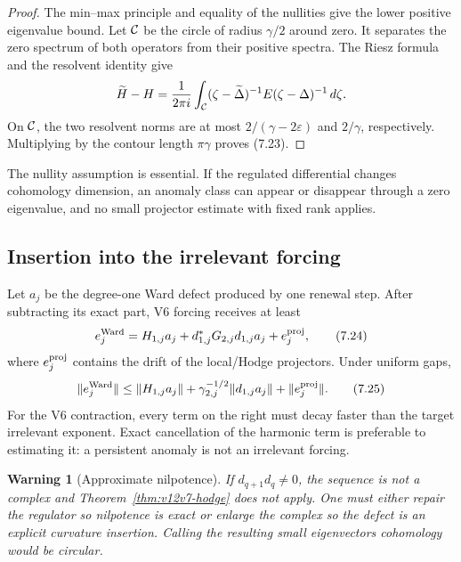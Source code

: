 \documentclass[11pt]{article}
\newtheorem{warning}[theorem]{Warning}
\theoremstyle{remark}
\begin{document}
\begin{proof}
The min--max principle and equality of the nullities give the lower
positive eigenvalue bound.  Let \({\cal C}\) be the circle of radius
\(\gamma/2\) around zero.  It separates the zero spectrum of both
operators from their positive spectra.  The Riesz formula and the
resolvent identity give
\[
 \widetilde H-H
 ={1\over2\pi i}\int_{\cal C}
   (\zeta-\widetilde\Delta)^{-1}
       E(\zeta-\Delta)^{-1}\,d\zeta.
\]
On \({\cal C}\), the two resolvent norms are at most
\(2/(\gamma-2\varepsilon)\) and \(2/\gamma\), respectively.
Multiplying by the contour length \(\pi\gamma\) proves (7.23).
\end{proof}

The nullity assumption is essential.  If the regulated differential
changes cohomology dimension, an anomaly class can appear or
disappear through a zero eigenvalue, and no small projector estimate
with fixed rank applies.

\subsection{Insertion into the irrelevant forcing}

Let \(a_j\) be the degree-one Ward defect produced by one renewal
step.  After subtracting its exact part, V6 forcing receives at least
\[
 e_j^{\rm Ward}
 =H_{1,j}a_j+d_{1,j}^*G_{2,j}d_{1,j}a_j
             +e_j^{\rm proj},                               \tag{7.24}
\]
where \(e_j^{\rm proj}\) contains the drift of the local/Hodge
projectors.  Under uniform gaps,
\[
 \|e_j^{\rm Ward}\|
 \le\|H_{1,j}a_j\|
    +\gamma_{2,j}^{-1/2}\|d_{1,j}a_j\|
    +\|e_j^{\rm proj}\|.                                    \tag{7.25}
\]
For the V6 contraction, every term on the right must decay faster
than the target irrelevant exponent.  Exact cancellation of the
harmonic term is preferable to estimating it: a persistent anomaly
is not an irrelevant forcing.

\begin{warning}[Approximate nilpotence]
\label{warn:v12v7-nilpotence}
If \(d_{q+1}d_q\ne0\), the sequence is not a complex and
Theorem~\ref{thm:v12v7-hodge} does not apply.  One must either repair
the regulator so nilpotence is exact or enlarge the complex so the
defect is an explicit curvature insertion.  Calling the resulting
small eigenvectors cohomology would be circular.
\end{warning}
\end{document}

